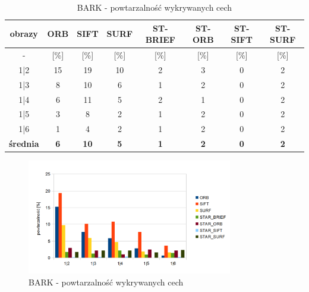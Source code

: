 \begin{table}[htbp]
  \centering
  \caption{BARK - powtarzalność wykrywanych cech}
    \begin{tabular}{|c|c|c|c|c|c|c|c|}\hline

    obrazy & \textbf{ORB} & \textbf{SIFT} & \textbf{SURF} & \textbf{ST-BRIEF} & \textbf{ST-ORB} & \textbf{ST-SIFT} & \textbf{ST-SURF} \\\hline

    -  & [\%] & [\%] & [\%] & [\%] & [\%] & [\%] & [\%] \\\hline
    1|2 & 15 & 19 & 10 & 2 & 3 & 0 & 2 \\
    1|3 & 8 & 10 & 6 & 1 & 2 & 0 & 2 \\
    1|4 & 6 & 11 & 5 & 2 & 1 & 0 & 2 \\
    1|5 & 3 & 8 & 2 & 1 & 2 & 0 & 2 \\
    1|6 & 1 & 4 & 2 & 1 & 2 & 0 & 2 \\\hline
    \textbf{średnia} & \textbf{6} & \textbf{10} & \textbf{5} & \textbf{1} & \textbf{2} & \textbf{0} & \textbf{2} \\\hline

    \end{tabular}%
  \label{tab:bark_m1}%
\end{table}%


\begin{figure}
\centering
\includegraphics[width=0.8\textwidth]{pict/mikolajczyk/bark/m1.png}
\caption{BARK - powtarzalność wykrywanych cech}
\label{fig:bark_m1}
\end{figure}

